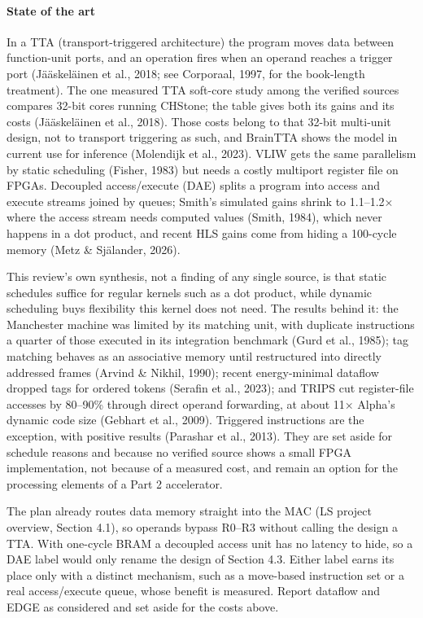 \paragraph{State of the art} In a TTA (transport-triggered architecture) the program moves data between function-unit ports, and an operation fires when an operand reaches a trigger port (Jääskeläinen et al., 2018; see Corporaal, 1997, for the book-length treatment). The one measured TTA soft-core study among the verified sources compares 32-bit cores running CHStone; the table gives both its gains and its costs (Jääskeläinen et al., 2018). Those costs belong to that 32-bit multi-unit design, not to transport triggering as such, and BrainTTA shows the model in current use for inference (Molendijk et al., 2023). VLIW gets the same parallelism by static scheduling (Fisher, 1983) but needs a costly multiport register file on FPGAs. Decoupled access/execute (DAE) splits a program into access and execute streams joined by queues; Smith's simulated gains shrink to 1.1–1.2× where the access stream needs computed values (Smith, 1984), which never happens in a dot product, and recent HLS gains come from hiding a 100-cycle memory (Metz \& Själander, 2026).

This review's own synthesis, not a finding of any single source, is that static schedules suffice for regular kernels such as a dot product, while dynamic scheduling buys flexibility this kernel does not need. The results behind it: the Manchester machine was limited by its matching unit, with duplicate instructions a quarter of those executed in its integration benchmark (Gurd et al., 1985); tag matching behaves as an associative memory until restructured into directly addressed frames (Arvind \& Nikhil, 1990); recent energy-minimal dataflow dropped tags for ordered tokens (Serafin et al., 2023); and TRIPS cut register-file accesses by 80–90\% through direct operand forwarding, at about 11× Alpha's dynamic code size (Gebhart et al., 2009). Triggered instructions are the exception, with positive results (Parashar et al., 2013). They are set aside for schedule reasons and because no verified source shows a small FPGA implementation, not because of a measured cost, and remain an option for the processing elements of a Part 2 accelerator.

\begin{forls}[For LS]
The plan already routes data memory straight into the MAC (LS project overview, Section 4.1), so operands bypass R0–R3 without calling the design a TTA. With one-cycle BRAM a decoupled access unit has no latency to hide, so a DAE label would only rename the design of Section 4.3. Either label earns its place only with a distinct mechanism, such as a move-based instruction set or a real access/execute queue, whose benefit is measured. Report dataflow and EDGE as considered and set aside for the costs above.

\end{forls}
